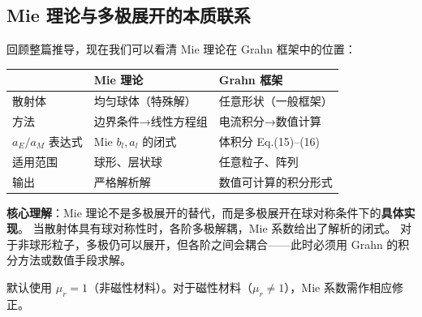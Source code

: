 \subsection{Mie 理论与多极展开的本质联系}

回顾整篇推导，现在我们可以看清 Mie 理论在 Grahn 框架中的位置：

\begin{center}
\begin{tabular}{p{3.5cm}p{5cm}p{5cm}}
\toprule
& \textbf{Mie 理论} & \textbf{Grahn 框架} \\
\midrule
散射体 & 均匀球体（特殊解） & 任意形状（一般框架） \\
方法 & 边界条件→线性方程组 & 电流积分→数值计算 \\
$a_E/a_M$ 表达式 & Mie $b_l,a_l$ 的闭式 & 体积分 Eq.(15)--(16) \\
适用范围 & 球形、层状球 & 任意粒子、阵列 \\
输出 & 严格解析解 & 数值可计算的积分形式 \\
\bottomrule
\end{tabular}
\end{center}

\begin{noteworthy}
\textbf{核心理解}：Mie 理论不是多极展开的替代，而是多极展开在球对称条件下的\textbf{具体实现}。
当散射体具有球对称性时，各阶多极解耦，Mie 系数给出了解析的闭式。
对于非球形粒子，多极仍可以展开，但各阶之间会耦合——此时必须用 Grahn 的积分方法或数值手段求解。
\end{noteworthy}

默认使用 $\mu_r=1$（非磁性材料）。对于磁性材料（$\mu_r\neq1$），Mie 系数需作相应修正。\bigskip
